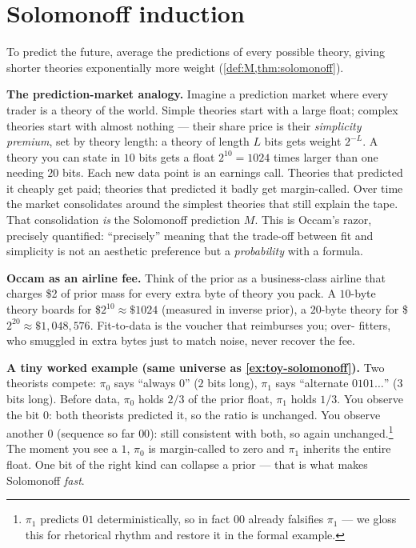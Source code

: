 \documentclass[12pt,a4paper]{article}
\theoremstyle{plain}
\theoremstyle{definition}
\begin{document}

\section{Solomonoff induction}
\label{sec:solomonoff}

\begin{intuition}
To predict the future, average the predictions of every possible
theory, giving shorter theories exponentially more weight
(\cref{def:M,thm:solomonoff}).

\textbf{The prediction-market analogy.}  Imagine a prediction market
where every trader is a theory of the world.  Simple theories start
with a large float; complex theories start with almost nothing ---
their share price is their \emph{simplicity premium}, set by theory
length: a theory of length $L$ bits gets weight $2^{-L}$.  A theory
you can state in $10$ bits gets a float $2^{10}=1024$ times larger
than one needing $20$ bits.  Each new data point is an earnings call.
Theories that predicted it cheaply get paid; theories that predicted
it badly get margin-called.  Over time the market consolidates around
the simplest theories that still explain the tape.  That
consolidation \emph{is} the Solomonoff prediction $M$.  This is
Occam's razor, precisely quantified: ``precisely'' meaning that the
trade-off between fit and simplicity is not an aesthetic preference
but a \emph{probability} with a formula.

\textbf{Occam as an airline fee.}  Think of the prior as a
business-class airline that charges \$2 of prior mass for every extra
byte of theory you pack.  A $10$-byte theory boards for
\$$2^{10}\!\approx\!\$1024$ (measured in inverse prior), a $20$-byte
theory for \$$2^{20}\!\approx\!\$1{,}048{,}576$.  Fit-to-data is the
voucher that reimburses you; over- fitters, who smuggled in extra
bytes just to match noise, never recover the fee.

\textbf{A tiny worked example (same universe as \cref{ex:toy-solomonoff}).}
Two theorists compete: $\pi_0$ says ``always $0$'' ($2$ bits long),
$\pi_1$ says ``alternate $0101\dots$'' ($3$ bits long).  Before data,
$\pi_0$ holds $2/3$ of the prior float, $\pi_1$ holds $1/3$.  You
observe the bit $0$: both theorists predicted it, so the ratio is
unchanged.  You observe another $0$ (sequence so far $00$): still
consistent with both, so again unchanged.\footnote{$\pi_1$ predicts
$01$ deterministically, so in fact $00$ already falsifies $\pi_1$ ---
we gloss this for rhetorical rhythm and restore it in the formal
example.}  The moment you see a $1$, $\pi_0$ is margin-called to
zero and $\pi_1$ inherits the entire float.  One bit of the right
kind can collapse a prior --- that is what makes Solomonoff
\emph{fast}.


\end{intuition}
\end{document}
